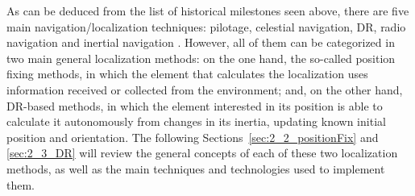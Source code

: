 As can be deduced from the list of historical milestones seen above, there are five main navigation/localization techniques: pilotage, celestial navigation, DR, radio navigation and inertial navigation \cite{grewal_global_2001}. 
However, all of them can be categorized in two main general localization methods:
on the one hand, the so-called position fixing methods, in which the element that calculates the localization uses information received or collected from the environment; and, on the other hand, DR-based methods, in which the element interested in its position is able to calculate it autonomously from changes in its inertia, updating known initial position and orientation.
The following Sections~\ref{sec:2_2_positionFix} and \ref{sec:2_3_DR} will review the general concepts of each of these two localization methods, as well as the main techniques and technologies used to implement them.